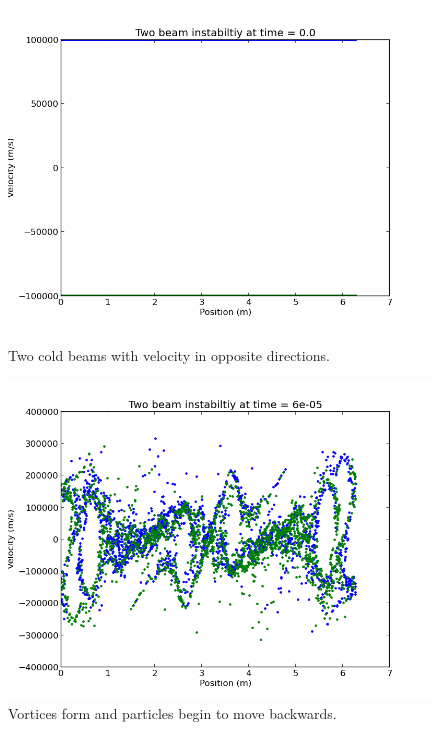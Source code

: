 \documentclass[12pt]{article}
\begin{document}
\begin{figure}    
\begin{minipage}[t]{0.45\textwidth}
\includegraphics[width=\linewidth]{t=0.png}
\caption{Two cold beams with velocity in opposite directions.}
\label{fig:immediate}
\end{minipage}
\hspace{\fill}
\begin{minipage}[t]{0.45\textwidth}
\includegraphics[width=\linewidth]{t=1.png}
\caption{Vortices form and particles begin to move backwards.}
\label{fig:proximal}
\end{minipage}


\end{figure}
\end{document}

